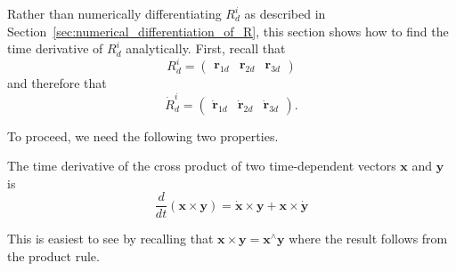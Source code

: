 Rather than numerically differentiating $R_d^i$ as described in Section~\ref{sec:numerical_differentiation_of_R}, this section shows how to find the time derivative of $R_d^i$ analytically.
First, recall that
\begin{equation}
	R_d^i = \begin{pmatrix} \mathbf{r}_{1d} & \mathbf{r}_{2d}&  \mathbf{r}_{3d} \end{pmatrix}
\end{equation}
and therefore that
\begin{equation}
	\dot{R}_d^i = \begin{pmatrix} \dot{\mathbf{r}}_{1d} & \dot{\mathbf{r}}_{2d} & \dot{\mathbf{r}}_{3d} \end{pmatrix}.
\end{equation}

To proceed, we need the following two properties.
\begin{property}
	The time derivative of the cross product of two time-dependent vectors $\mathbf{x}$ and $\mathbf{y}$ is
	\begin{equation}
		\label{eq:cross_derivative}
		\frac{d}{dt} (\mathbf{x} \times \mathbf{y}) = \dot{\mathbf{x}} \times \mathbf{y} + \mathbf{x} \times \dot{\mathbf{y}}
	\end{equation}
\end{property}
\proof
This is easiest to see by recalling that $\mathbf{x} \times \mathbf{y} = \mathbf{x}^\wedge \mathbf{y}$ where the result follows from the product rule.
\endproof

